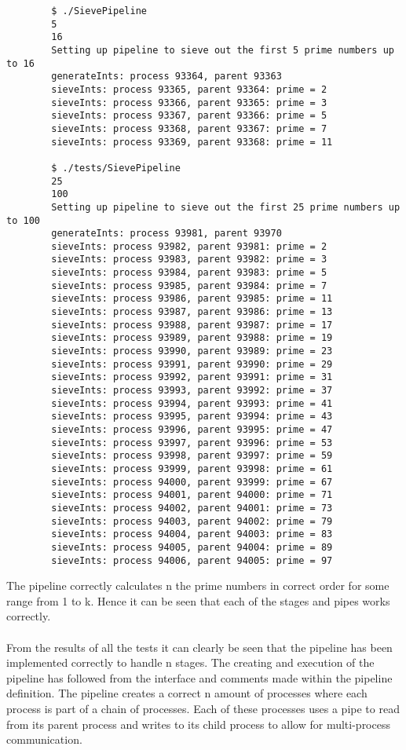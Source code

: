 \documentclass{article}
\begin{document}
        \begin{verbatim}
        $ ./SievePipeline
        5
        16
        Setting up pipeline to sieve out the first 5 prime numbers up to 16
        generateInts: process 93364, parent 93363
        sieveInts: process 93365, parent 93364: prime = 2
        sieveInts: process 93366, parent 93365: prime = 3
        sieveInts: process 93367, parent 93366: prime = 5
        sieveInts: process 93368, parent 93367: prime = 7
        sieveInts: process 93369, parent 93368: prime = 11

        $ ./tests/SievePipeline
        25
        100
        Setting up pipeline to sieve out the first 25 prime numbers up to 100
        generateInts: process 93981, parent 93970
        sieveInts: process 93982, parent 93981: prime = 2
        sieveInts: process 93983, parent 93982: prime = 3
        sieveInts: process 93984, parent 93983: prime = 5
        sieveInts: process 93985, parent 93984: prime = 7
        sieveInts: process 93986, parent 93985: prime = 11
        sieveInts: process 93987, parent 93986: prime = 13
        sieveInts: process 93988, parent 93987: prime = 17
        sieveInts: process 93989, parent 93988: prime = 19
        sieveInts: process 93990, parent 93989: prime = 23
        sieveInts: process 93991, parent 93990: prime = 29
        sieveInts: process 93992, parent 93991: prime = 31
        sieveInts: process 93993, parent 93992: prime = 37
        sieveInts: process 93994, parent 93993: prime = 41
        sieveInts: process 93995, parent 93994: prime = 43
        sieveInts: process 93996, parent 93995: prime = 47
        sieveInts: process 93997, parent 93996: prime = 53
        sieveInts: process 93998, parent 93997: prime = 59
        sieveInts: process 93999, parent 93998: prime = 61
        sieveInts: process 94000, parent 93999: prime = 67
        sieveInts: process 94001, parent 94000: prime = 71
        sieveInts: process 94002, parent 94001: prime = 73
        sieveInts: process 94003, parent 94002: prime = 79
        sieveInts: process 94004, parent 94003: prime = 83
        sieveInts: process 94005, parent 94004: prime = 89
        sieveInts: process 94006, parent 94005: prime = 97
        \end{verbatim}

    \noindent The pipeline correctly calculates n the prime numbers in correct order for some range from 1 to k.
    Hence it can be seen that each of the stages and pipes works correctly.
    \\ \\ From the results of all the tests it can clearly be seen that the pipeline has been implemented correctly to handle n stages.
    The creating and execution of the pipeline has followed from the interface and comments made within the pipeline definition.
    The pipeline creates a correct n amount of processes where each process is part of a chain of processes.
    Each of these processes uses a pipe to read from its parent process and writes to its child process to allow for multi-process communication.
\end{document}
